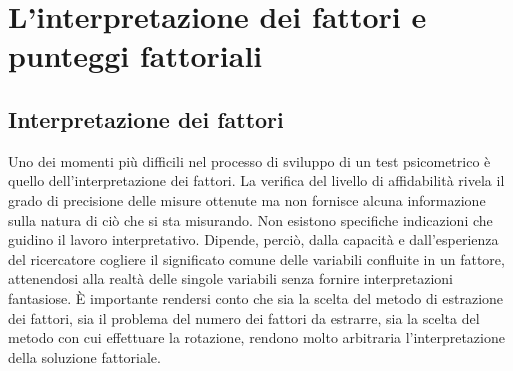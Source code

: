 \chapter{L'interpretazione dei fattori e punteggi fattoriali}
\label{ch:punteggi_fattoriali}


\vskip40pt


\section{Interpretazione dei fattori}

Uno dei momenti più difficili nel processo di sviluppo di un test psicometrico è quello dell'interpretazione dei fattori. La verifica del livello di affidabilità rivela il grado di precisione delle misure ottenute ma non fornisce alcuna informazione sulla natura di ciò che si sta misurando. Non esistono specifiche indicazioni che guidino il lavoro interpretativo. Dipende, perciò, dalla capacità e dall'esperienza del ricercatore cogliere il significato comune delle variabili confluite in un fattore, attenendosi alla realtà delle singole variabili senza fornire interpretazioni fantasiose. È importante rendersi conto che sia la scelta del metodo di estrazione dei fattori, sia il problema del numero dei fattori da estrarre, sia la scelta del metodo con cui effettuare la rotazione, rendono molto arbitraria l'interpretazione della soluzione fattoriale.


